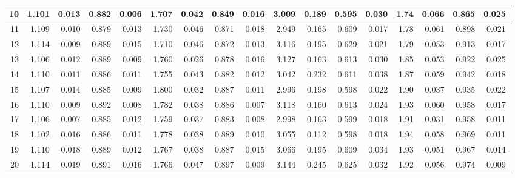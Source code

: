 \documentclass[
]{article}
\begin{document}
\begin{table}[H]
{\begin{tabular}[t]{r|r|r|r|r|r|r|r|r|r|r|r|r|r|r|r|r}
\hline
\hspace{1em}10 & 1.101 & 0.013 & 0.882 & 0.006 & 1.707 & 0.042 & 0.849 & 0.016 & 3.009 & 0.189 & 0.595 & 0.030 & 1.74 & 0.066 & 0.865 & 0.025\\
\hline
\hspace{1em}11 & 1.109 & 0.010 & 0.879 & 0.013 & 1.730 & 0.046 & 0.871 & 0.018 & 2.949 & 0.165 & 0.609 & 0.017 & 1.78 & 0.061 & 0.898 & 0.021\\
\hline
\hspace{1em}12 & 1.114 & 0.009 & 0.889 & 0.015 & 1.710 & 0.046 & 0.872 & 0.013 & 3.116 & 0.195 & 0.629 & 0.021 & 1.79 & 0.053 & 0.913 & 0.017\\
\hline
\hspace{1em}13 & 1.106 & 0.012 & 0.889 & 0.009 & 1.760 & 0.026 & 0.878 & 0.016 & 3.127 & 0.163 & 0.613 & 0.030 & 1.85 & 0.053 & 0.922 & 0.025\\
\hline
\hspace{1em}14 & 1.110 & 0.011 & 0.886 & 0.011 & 1.755 & 0.043 & 0.882 & 0.012 & 3.042 & 0.232 & 0.611 & 0.038 & 1.87 & 0.059 & 0.942 & 0.018\\
\hline
\hspace{1em}15 & 1.107 & 0.014 & 0.885 & 0.009 & 1.800 & 0.032 & 0.887 & 0.011 & 2.996 & 0.198 & 0.598 & 0.022 & 1.90 & 0.037 & 0.935 & 0.022\\
\hline
\hspace{1em}16 & 1.110 & 0.009 & 0.892 & 0.008 & 1.782 & 0.038 & 0.886 & 0.007 & 3.118 & 0.160 & 0.613 & 0.024 & 1.93 & 0.060 & 0.958 & 0.017\\
\hline
\hspace{1em}17 & 1.106 & 0.007 & 0.885 & 0.012 & 1.759 & 0.037 & 0.883 & 0.008 & 2.998 & 0.163 & 0.599 & 0.018 & 1.91 & 0.031 & 0.958 & 0.011\\
\hline
\hspace{1em}18 & 1.102 & 0.016 & 0.886 & 0.011 & 1.778 & 0.038 & 0.889 & 0.010 & 3.055 & 0.112 & 0.598 & 0.018 & 1.94 & 0.058 & 0.969 & 0.011\\
\hline
\hspace{1em}19 & 1.110 & 0.018 & 0.889 & 0.012 & 1.767 & 0.038 & 0.887 & 0.015 & 3.066 & 0.195 & 0.609 & 0.034 & 1.93 & 0.051 & 0.967 & 0.014\\
\hline
\hspace{1em}20 & 1.114 & 0.019 & 0.891 & 0.016 & 1.766 & 0.047 & 0.897 & 0.009 & 3.144 & 0.245 & 0.625 & 0.032 & 1.92 & 0.056 & 0.974 & 0.009\\
\hline
\end{tabular}}
\end{table}
\end{document}
